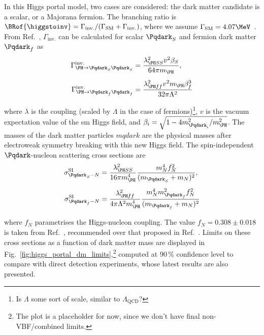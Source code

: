 In this Higgs portal model, two cases are considered: the dark matter candidate is a scalar, or a Majorana fermion. The branching ratio is $\BRof{\higgstoinv} = \Gamma_{\mathrm{inv.}}/(\Gamma_{\mathrm{SM}} + \Gamma_{\mathrm{inv.}})$, where we assume $\Gamma_{\mathrm{SM}} = \text{4.07}\MeV$~\cite{Heinemeyer:1559921}. From Ref.~, $\Gamma_{\mathrm{inv.}}$ can be calculated for scalar $\Pqdark_{S}$ and fermion dark matter $\Pqdark_{f}$ as
\begin{equation}
    \begin{aligned}
\Gamma^{\mathrm{inv.}}_{\PH \rightarrow \Pqdark_{S}\Pqdark_{S}} &= \frac{ \lambda^2_{\PH SS} v^2 \beta_S }{64\pi m_{\PH}},\\[0.5em]
\Gamma^{\mathrm{inv.}}_{\PH \rightarrow \Pqdark_{f}\Pqdark_{f}} &= \frac{ \lambda^2_{\PH ff} v^2 m_{\PH} \beta_f^3 }{ 32\pi \Lambda^2 }
    \end{aligned}
\end{equation}

where $\lambda$ is the coupling (scaled by $\Lambda$ in the case of fermions)\footnote{Is $\Lambda$ some sort of scale, similar to $\Lambda_{\mathrm{QCD}}$?}, $v$ is the vacuum expectation value of the \acrshort{sm} Higgs field, and $\beta_i = \sqrt{1 - 4m_{\Pqdark_i}^2/m_{\PH}^2}$. The masses of the dark matter particles $mqdark$ are the physical masses after electroweak symmetry breaking with this new Higgs field. The spin-independent $\Pqdark$-nucleon scattering cross sections are
\begin{equation}
    \begin{aligned}
\sigma^{\mathrm{SI}}_{\Pqdark_{S}-N} &= \frac{\lambda^2_{\PH SS} }{ 16 \pi m_{\PH}^4} \frac{ m_N^4 f_N^2 }{ (m_{\Pqdark_{S}} + m_N)^2 },\\[0.5em]
\sigma^{\mathrm{SI}}_{\Pqdark_{f}-N} &= \frac{\lambda^2_{\PH ff} }{ 4 \pi \Lambda^2 m_{\PH}^4} \frac{ m_N^4 m_{\Pqdark_{f}}^2 f_N^2 }{ (m_{\Pqdark_{f}} + m_N)^2 }
    \end{aligned}
\end{equation}

where $f_N$ parametrises the Higgs-nucleon coupling. The value $f_N = \text{0.308} \pm \text{0.018}$ is taken from Ref.~, recommended over that proposed in Ref.~. Limits on these cross sections as a function of dark matter mass are displayed in Fig.~\ref{fig:higgs_portal_dm_limits},\footnote{The plot is a placeholder for now, since we don't have final non-VBF/combined limits.} computed at 90\,\% confidence level to compare with direct detection experiments, whose latest results are also presented.

